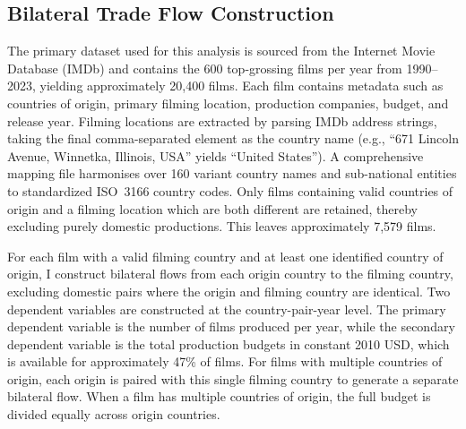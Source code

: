 %
%
%

\subsection{Bilateral Trade Flow Construction}
\label{sec:data_flows}

The primary dataset used for this analysis is sourced from the Internet Movie Database (IMDb) and contains the 600 top-grossing films per year from 1990--2023, yielding approximately 20,400 films. Each film contains metadata such as countries of origin, primary filming location, production companies, budget, and release year. Filming locations are extracted by parsing IMDb address strings, taking the final comma-separated element as the country name (e.g., ``671 Lincoln Avenue, Winnetka, Illinois, USA'' yields ``United States''). A comprehensive mapping file harmonises over 160 variant country names and sub-national entities to standardized ISO~3166 country codes. Only films containing valid countries of origin and a filming location which are both different are retained, thereby excluding purely domestic productions. This leaves approximately 7,579 films.

For each film with a valid filming country and at least one identified country of origin, I construct bilateral flows from each origin country to the filming country, excluding domestic pairs where the origin and filming country are identical. Two dependent variables are constructed at the country-pair-year level. The primary dependent variable is the number of films produced per year, while the secondary dependent variable is the total production budgets in constant 2010 USD, which is available for approximately 47\% of films. For films with multiple countries of origin, each origin is paired with this single filming country to generate a separate bilateral flow. When a film has multiple countries of origin, the full budget is divided equally across origin countries.

